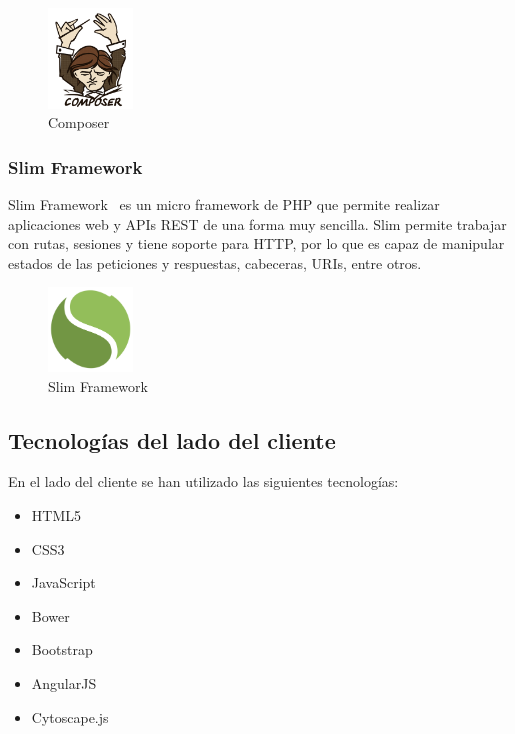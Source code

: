 \begin{figure}[tbh]
\centering
\label{fig:composer}
\includegraphics[width=0.2\textwidth]{imagenes/composer}
\caption{Composer}
\end{figure}

\subsubsection*{Slim Framework}

Slim Framework~\cite{slim} es un micro framework de PHP que permite realizar aplicaciones web y APIs REST de una forma muy sencilla. Slim permite trabajar con rutas, sesiones y tiene soporte para HTTP, por lo que es capaz de manipular estados de las peticiones y respuestas, cabeceras, URIs, entre otros.

\begin{figure}[tbh]
\centering
\label{fig:slim}
\includegraphics[width=0.2\textwidth]{imagenes/slim}
\caption{Slim Framework}
\end{figure}

\subsection{Tecnologías del lado del cliente}

En el lado del cliente se han utilizado las siguientes tecnologías:

\begin{itemize}
\item HTML5
\item CSS3
\item JavaScript
\item Bower
\item Bootstrap
\item AngularJS
\item Cytoscape.js
\end{itemize}

